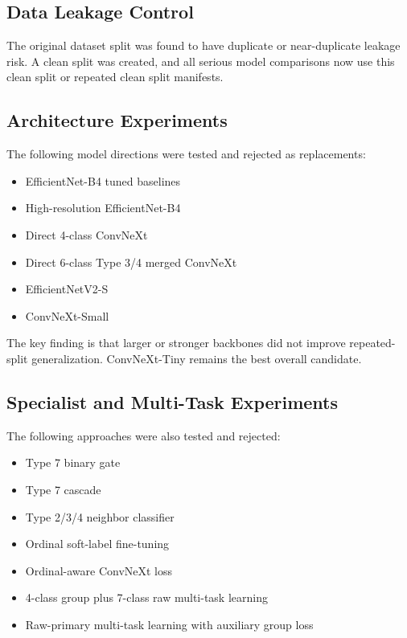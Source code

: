 \documentclass[11pt]{article}
\begin{document}
\subsection{Data Leakage Control}

The original dataset split was found to have duplicate or near-duplicate leakage risk. A clean split was created, and all serious model comparisons now use this clean split or repeated clean split manifests.

\subsection{Architecture Experiments}

The following model directions were tested and rejected as replacements:

\begin{itemize}
    \item EfficientNet-B4 tuned baselines
    \item High-resolution EfficientNet-B4
    \item Direct 4-class ConvNeXt
    \item Direct 6-class Type 3/4 merged ConvNeXt
    \item EfficientNetV2-S
    \item ConvNeXt-Small
\end{itemize}

The key finding is that larger or stronger backbones did not improve repeated-split generalization. ConvNeXt-Tiny remains the best overall candidate.

\subsection{Specialist and Multi-Task Experiments}

The following approaches were also tested and rejected:

\begin{itemize}
    \item Type 7 binary gate
    \item Type 7 cascade
    \item Type 2/3/4 neighbor classifier
    \item Ordinal soft-label fine-tuning
    \item Ordinal-aware ConvNeXt loss
    \item 4-class group plus 7-class raw multi-task learning
    \item Raw-primary multi-task learning with auxiliary group loss
\end{itemize}
\end{document}
